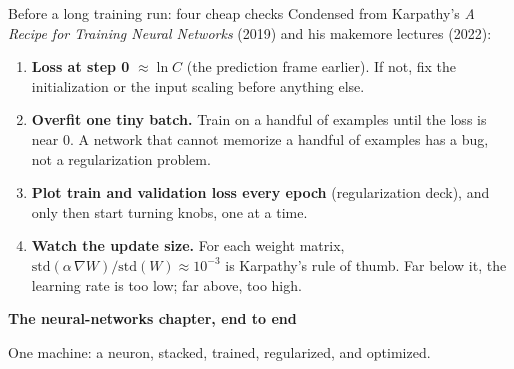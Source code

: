 \documentclass[aspectratio=43]{beamer}
\begin{document}
\begin{frame}{Before a long training run: four cheap checks}
  \small
  Condensed from Karpathy's \emph{A Recipe for Training Neural Networks} (2019) and his makemore
  lectures (2022):
  \vfill
  \begin{enumerate}\small
    \item \textbf{Loss at step 0} $\approx \ln C$ (the prediction frame earlier). If not, fix the
      initialization or the input scaling before anything else.
    \item \textbf{Overfit one tiny batch.} Train on a handful of examples until the loss is near
      $0$. A network that cannot memorize a handful of examples has a bug, not a regularization
      problem.
    \item \textbf{Plot train and validation loss every epoch} (regularization deck), and only then
      start turning knobs, one at a time.
    \item \textbf{Watch the update size.} For each weight matrix,
      $\mathrm{std}(\alpha\,\nabla W) / \mathrm{std}(W) \approx 10^{-3}$ is Karpathy's rule of thumb.
      Far below it, the learning rate is too low; far above, too high.
  \end{enumerate}
  \vfill
\end{frame}

\begin{frame}[plain]
  \vfill
  \begin{center}
    {\Large\color{popblue}\textbf{The neural-networks chapter, end to end}}\\[0.9em]
    \begin{minipage}{0.82\textwidth}\centering\small
      One machine: a neuron, stacked, trained, regularized, and optimized.
    \end{minipage}
  \end{center}
  \vfill
\end{frame}
\end{document}
